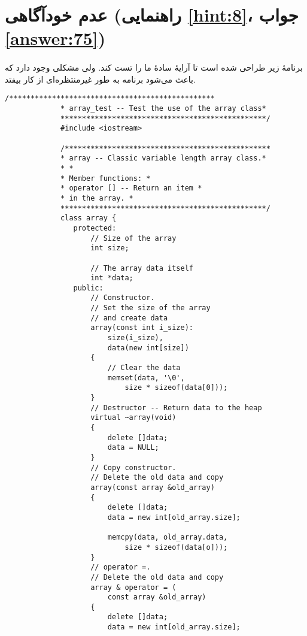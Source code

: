 \section[عدم خودآگاهی]{عدم خودآگاهی \protect{} (راهنمایی \ref{hint:8}، جواب \ref{answer:75})}
\paragraph{}\label{prog:86}
برنامهٔ زیر طراحی شده است تا آرایهٔ سادهٔ ما را تست کند. ولی مشکلی وجود دارد که باعث می‌شود برنامه به طور غیرمنتظره‌ای از کار بیفتد.

\begin{LTR}
        \begin{lstlisting}[style=C++Style]
             /************************************************
             * array_test -- Test the use of the array class*
             ************************************************/
             #include <iostream>

             /************************************************
             * array -- Classic variable length array class.*
             * *
             * Member functions: *
             * operator [] -- Return an item *
             * in the array. *
             ************************************************/
             class array {
             	protected:
             		// Size of the array
             		int size;

             		// The array data itself
             		int *data;
             	public:
             		// Constructor.
             		// Set the size of the array
             		// and create data
             		array(const int i_size):
             			size(i_size),
             			data(new int[size])
             		{
             			// Clear the data
            			memset(data, '\0',
             				size * sizeof(data[0]));
             		}
             		// Destructor -- Return data to the heap
             		virtual ~array(void)
             		{
             			delete []data;
             			data = NULL;
             		}
             		// Copy constructor.
             		// Delete the old data and copy
             		array(const array &old_array)
             		{
             			delete []data;
             			data = new int[old_array.size];

             			memcpy(data, old_array.data,
             				size * sizeof(data[o]));
             		}
             		// operator =.
             		// Delete the old data and copy
             		array & operator = (
             			const array &old_array)
             		{
             			delete []data;
             			data = new int[old_array.size];


\end{lstlisting}
\end{LTR}
